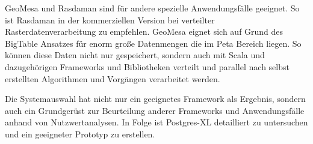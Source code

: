 GeoMesa und Rasdaman sind für andere spezielle Anwendungsfälle geeignet.
So ist Rasdaman in der kommerziellen Version bei verteilter Rasterdatenverarbeitung zu empfehlen.
GeoMesa eignet sich auf Grund des BigTable Ansatzes für enorm große Datenmengen die im Peta Bereich liegen.
So können diese Daten nicht nur gespeichert, sondern auch mit Scala und dazugehörigen Frameworks und Bibliotheken verteilt und parallel nach selbst erstellten Algorithmen und Vorgängen verarbeitet werden.

Die Systemauswahl hat nicht nur ein geeignetes Framework als Ergebnis, sondern auch ein Grundgerüst zur Beurteilung anderer Frameworks und Anwendungsfälle anhand von Nutzwertanalysen.
In Folge ist Postgres-XL detailliert zu untersuchen und ein geeigneter Prototyp zu erstellen.
